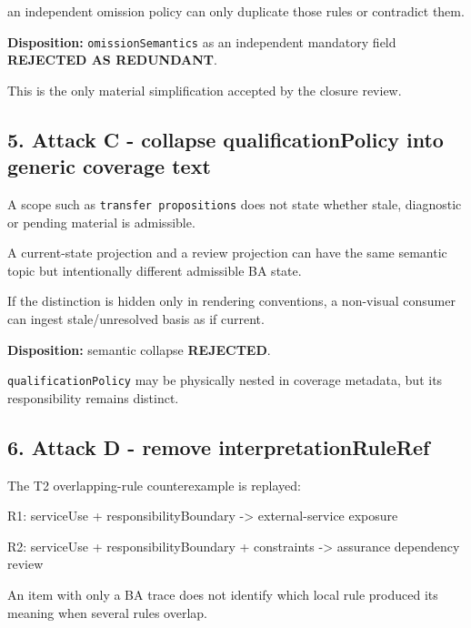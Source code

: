 \documentclass[
  11pt,
  a4paper,
]{article}
\newenvironment{Shaded}{}{}
\newcommand{\NormalTok}[1]{#1}
\begin{document}
an independent omission policy can only duplicate those rules or
contradict them.

\textbf{Disposition:} \texttt{omissionSemantics} as an independent
mandatory field \textbf{REJECTED AS REDUNDANT}.

This is the only material simplification accepted by the closure review.

\subsection{5. Attack C - collapse qualificationPolicy into generic
coverage
text}\label{attack-c---collapse-qualificationpolicy-into-generic-coverage-text}

A scope such as \texttt{transfer\ propositions} does not state whether
stale, diagnostic or pending material is admissible.

A current-state projection and a review projection can have the same
semantic topic but intentionally different admissible BA state.

If the distinction is hidden only in rendering conventions, a non-visual
consumer can ingest stale/unresolved basis as if current.

\textbf{Disposition:} semantic collapse \textbf{REJECTED}.

\texttt{qualificationPolicy} may be physically nested in coverage
metadata, but its responsibility remains distinct.

\subsection{6. Attack D - remove
interpretationRuleRef}\label{attack-d---remove-interpretationruleref}

The T2 overlapping-rule counterexample is replayed:

\begin{Shaded}
\begin{Highlighting}[]
\NormalTok{R1: serviceUse + responsibilityBoundary}
\NormalTok{    {-}\textgreater{} external{-}service exposure}

\NormalTok{R2: serviceUse + responsibilityBoundary + constraints}
\NormalTok{    {-}\textgreater{} assurance dependency review}
\end{Highlighting}
\end{Shaded}

An item with only a BA trace does not identify which local rule produced
its meaning when several rules overlap.
\end{document}
